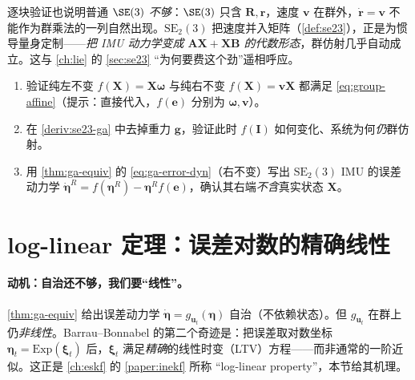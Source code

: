 \begin{insight}
逐块验证也说明普通 $\SE(3)$ \emph{不够}：$\SE(3)$ 只含 $\mathbf{R},\mathbf{r}$，速度 $\mathbf{v}$ 在群外，$\dot{\mathbf{r}}=\mathbf{v}$ 不能作为群乘法的一列自然出现。$\mathrm{SE}_2(3)$ 把速度并入矩阵（\cref{def:se23}），正是为惯导量身定制——\emph{把 IMU 动力学变成 $\mathbf{A}\mathbf{X}+\mathbf{X}\mathbf{B}$ 的代数形态}，群仿射几乎自动成立。这与 \cref{ch:lie} 的 \cref{sec:se23} “为何要费这个劲”遥相呼应。
\end{insight}

\begin{practice}
\begin{enumerate}
  \item 验证纯左不变 $f(\mathbf{X})=\mathbf{X}\boldsymbol{\omega}$ 与纯右不变 $f(\mathbf{X})=\mathbf{v}\mathbf{X}$ 都满足 \cref{eq:group-affine}（提示：直接代入，$f(\mathbf{e})$ 分别为 $\boldsymbol{\omega},\mathbf{v}$）。
  \item 在 \cref{deriv:se23-ga} 中去掉重力 $\mathbf{g}$，验证此时 $f(\mathbf{I})$ 如何变化、系统为何\emph{仍}群仿射。
  \item 用 \cref{thm:ga-equiv} 的 \cref{eq:ga-error-dyn}（右不变）写出 $\mathrm{SE}_2(3)$ IMU 的误差动力学 $\dot{\boldsymbol{\eta}}^R=f(\boldsymbol{\eta}^R)-\boldsymbol{\eta}^R f(\mathbf{e})$，确认其右端\emph{不含}真实状态 $\mathbf{X}$。
\end{enumerate}
\end{practice}

\section{log-linear 定理：误差对数的精确线性}
\label{sec:log-linear}

\paragraph{动机：自治还不够，我们要“线性”。}
\cref{thm:ga-equiv} 给出误差动力学 $\dot{\boldsymbol{\eta}}=g_{\mathbf{u}_t}(\boldsymbol{\eta})$ 自治（不依赖状态）。但 $g_{\mathbf{u}_t}$ 在群上仍\emph{非线性}。Barrau--Bonnabel 的第二个奇迹是：把误差取对数坐标 $\boldsymbol{\eta}_t=\mathrm{Exp}(\boldsymbol{\xi}_t)$ 后，$\boldsymbol{\xi}_t$ 满足\emph{精确}的线性时变（LTV）方程——而非通常的一阶近似。这正是 \cref{ch:eskf} 的 \cref{paper:inekf} 所称 “log-linear property”，本节给其机理。


